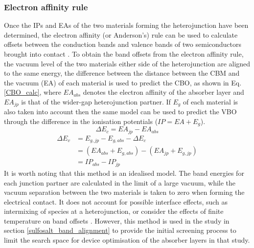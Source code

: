 \documentclass[11pt, twoside]{report}
\begin{document}
\subsubsection{Electron affinity rule}
Once the IPs and EAs of the two materials forming the heterojunction have been determined, the electron affinity (or Anderson's) rule can be used to calculate offsets between the conduction bands and valence bands of two semiconductors brought into contact \cite{Anderson_rule, keith_contacts}.
To obtain the band offsets from the electron affinity rule, the vacuum level of the two materials either side of the heterojunction are aligned to the same energy, the difference between the distance between the CBM and the vacuum (EA) of each material is used to predict the CBO, as shown in Eq. \ref{CBO_calc}, where $EA_{abs}$ denotes the electron affinity of the absorber layer and $EA_{jp}$ is that of the wider-gap heterojunction partner. If $E_g$ of each material is also taken into account then the same model can be used to predict the VBO through the difference in the ionisation potentials ($IP = EA + E_g$). 
\begin{equation}\label{CBO_calc}
\Delta E_c = EA_{jp} - EA_{abs}
\end{equation}
\begin{equation}\label{VBO_calc}
\begin{aligned}
\Delta E_v & = E_{g,jp} - E_{g,abs} - \Delta E_c \\
& = (EA_{abs }+ E_{g, abs}) - (EA_{jp} + E_{g,jp}) \\
& = IP_{abs} - IP_{jp}
\end{aligned}
\end{equation}
It is worth noting that this method is an idealised model. The band energies for each junction partner are calculated in the limit of a large vacuum, while the vacuum separation between the two materials is taken to zero when forming the electrical contact. It does not account for possible interface effects, such as intermixing of species at a heterojunction, or consider the effects of finite temperature on band offsets \cite{Bartomeu_T_effects}. However, this method is used in the study in section \ref{sulfosalt_band_alignment} to provide the initial screening process to limit the search space for device optimisation of the absorber layers in that study.
\end{document}
